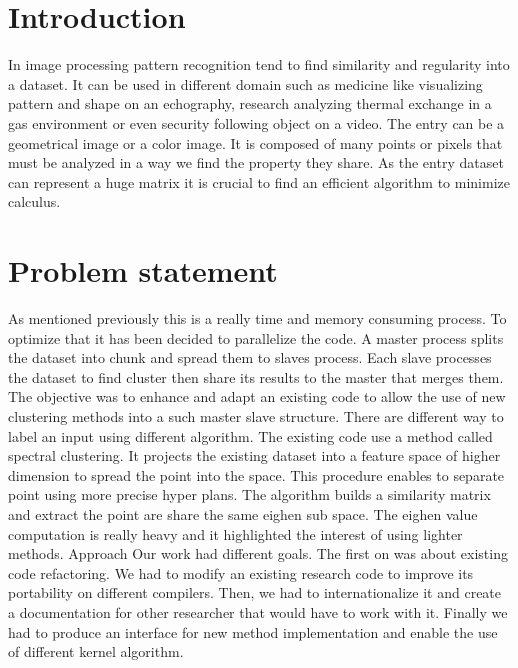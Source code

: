 \section*{Introduction}
In image processing pattern recognition tend to find similarity and regularity into a dataset. It can be  used in different domain such as medicine like visualizing pattern and shape on an echography, research analyzing thermal exchange in a gas environment or even security following object on a video. The entry can be a geometrical image or a color image. It is composed of many points or pixels that must be analyzed in a way we find the property they share. As the entry dataset can represent a huge matrix it is crucial to find an efficient algorithm to minimize calculus.

\section*{Problem statement}
 As mentioned previously this is a really time and memory consuming process. To optimize that it has been decided to parallelize the code. A master process splits the dataset into chunk and spread them to slaves process. Each slave processes the dataset to find cluster then share its results to the master that merges them. The objective was to enhance and adapt an existing code to allow the use of new clustering methods into a such master slave structure. 
There are different way to label an input using different algorithm. The existing code use a method called spectral clustering. It projects the existing dataset into a feature space of higher dimension to spread the point into the space. This procedure enables to separate point using more precise hyper plans. The algorithm builds a similarity matrix and extract the point are share the same eighen sub space. The eighen value computation is really heavy and it highlighted the interest of using lighter methods.
Approach
Our work had different goals. The first on was about existing code refactoring. We had to modify an existing research code to improve its portability on different compilers. Then, we had to internationalize it and create a documentation for other researcher that would have to work with it. Finally we had to produce an interface for new method implementation and enable the use of different kernel algorithm. 



\begin{figure}[H] %
\caption{}
\label{fig:speciation}
\end{figure}




